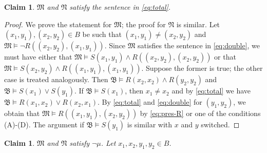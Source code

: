 \documentclass[nonacm]{acmart}
\newcommand{\bB}{{\mathfrak B}}
\newcommand{\bM}{{\mathfrak M}}
\newcommand{\bN}{{\mathfrak N}}
\newtheorem{claim}[theorem]{Claim}
\begin{document}
\begin{claim} \label{cl:3}
$\bM$ and $\bN$ satisfy the sentence in \eqref{eq:total}.
\end{claim}

\begin{proof}
We prove the statement for $\bM$; the proof for $\bN$ is similar. Let $(x_1,y_1), (x_2, y_2) \in B$ be such that $(x_1, y_1) \neq (x_2, y_2)$ and $\bM \models 
\neg R((x_2, y_2), (x_1, y_1))$. Since $\bM$ satisfies the sentence in \eqref{eq:double}, we must have either that $\bM \models S(x_1, y_1) \wedge R((x_2, y_2), (x_2, y_2))$ or that $\bM \models S(x_2, y_2) \wedge R((x_1, y_1), (x_1, y_1))$. Suppose the former is true; the other case is treated analogously. Then $\bB \models R(x_2, x_2) \wedge R(y_2, y_2)$ and $\bB \models S(x_1) \vee S(y_1)$. If $\bB \models S(x_1)$, then $x_1 \neq x_2$ and by \eqref{eq:total} we have $\bB \models R(x_1,x_2) \vee R(x_2, x_1)$. By \eqref{eq:total} and \eqref{eq:double} for $(y_1,y_2)$, we obtain that $\bM \models R((x_1, y_1), (x_2, y_2))$ by \eqref{eq:pres-R} or one of the conditions (A)-(D). The argument if $\bB \models S(y_1)$ is similar with $x$ and $y$ switched.
\end{proof}

\begin{claim} \label{cl:4}
$\bM$ and $\bN$ satisfy $\neg \mu$. Let
$x_1,x_2,y_1,y_2 \in B$.
\end{claim}
\end{document}
